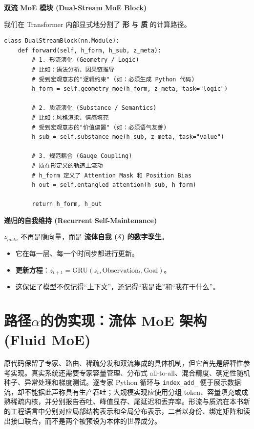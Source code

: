 \textbf{双流 MoE 模块 (Dual-Stream MoE Block)}

我们在 Transformer 内部显式地分割了 \textbf{形} 与 \textbf{质} 的计算路径。

\begin{lstlisting}
class DualStreamBlock(nn.Module):
    def forward(self, h_form, h_sub, z_meta):
        # 1. 形流演化 (Geometry / Logic)
        # 比如：语法分析、因果链推导
        # 受到宏观意志的"逻辑约束" (如：必须生成 Python 代码)
        h_form = self.geometry_moe(h_form, z_meta, task="logic")

        # 2. 质流演化 (Substance / Semantics)
        # 比如：风格渲染、情感填充
        # 受到宏观意志的"价值偏置" (如：必须语气友善)
        h_sub = self.substance_moe(h_sub, z_meta, task="value")

        # 3. 规范耦合 (Gauge Coupling)
        # 质在形定义的轨道上流动
        # h_form 定义了 Attention Mask 和 Position Bias
        h_out = self.entangled_attention(h_sub, h_form)

        return h_form, h_out
\end{lstlisting}



\textbf{递归的自我维持 (Recurrent Self-Maintenance)}

\textbf{$z_{meta}$} 不再是隐向量，而是 \textbf{流体自我 ($\mathcal{S}$) 的数字孪生}。
\begin{itemize}
    \item   它在每一层、每一个时间步都进行更新。
    \item   \textbf{更新方程}：$z_{t+1} = \text{GRU}(z_t, \text{Observation}_t, \text{Goal})$。
    \item   这保证了模型不仅记得“上下文”，还记得“我是谁”和“我在干什么”。
\end{itemize}


\section{路径\texorpdfstring{$\alpha$}{α}的伪实现：流体 MoE 架构 (Fluid MoE)}
\label{sec:section_5178}
原代码保留了专家、路由、稀疏分发和双流集成的具体机制，但它首先是解释性参考实现。真实系统还需要专家容量管理、分布式 all-to-all、混合精度、确定性随机种子、异常处理和梯度测试。逐专家 Python 循环与 \lstinline|index_add_| 便于展示数据流，却不能据此声称具有生产吞吐；大规模实现应使用分组 token、容量填充或成熟稀疏内核，并分别报告吞吐、峰值显存、尾延迟和丢弃率。形流与质流在本书新的工程语言中分别对应局部结构表示和全局分布表示，二者以身份、绑定矩阵和读出接口联合，而不是两个被预设为本体的世界成分。

